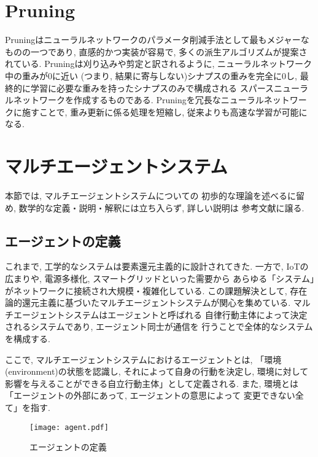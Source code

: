 \section{Pruning}
Pruningはニューラルネットワークのパラメータ削減手法として最もメジャーなものの一つであり, 
直感的かつ実装が容易で, 多くの派生アルゴリズムが提案されている.
Pruningは刈り込みや剪定と訳されるように, ニューラルネットワーク中の重みが0に近い
(つまり, 結果に寄与しない)シナプスの重みを完全に$0$し, 最終的に学習に必要な重みを持ったシナプスのみで構成される
スパースニューラルネットワークを作成するものである.
Pruningを冗長なニューラルネットワークに施すことで, 重み更新に係る処理を短縮し, 
従来よりも高速な学習が可能になる.
\clearpage
\section{マルチエージェントシステム}
本節では, マルチエージェントシステムについての
初歩的な理論を述べるに留め, 数学的な定義・説明・解釈には立ち入らず, 詳しい説明は
参考文献\cite{マルチエージェントシステムの基礎と応用}に譲る.
\subsection*{エージェントの定義}
これまで, 工学的なシステムは要素還元主義的に設計されてきた.
一方で, IoTの広まりや, 電源多様化, スマートグリッドといった需要から
あらゆる「システム」がネットワークに接続され大規模・複雑化している. 
この課題解決として, 
存在論的還元主義に基づいたマルチエージェントシステムが関心を集めている.
マルチエージェントシステムはエージェントと呼ばれる
自律行動主体によって決定されるシステムであり, エージェント同士が通信を
行うことで全体的なシステムを構成する.

ここで, マルチエージェントシステムにおけるエージェントとは, 
「環境(environment)の状態を認識し, 
それによって自身の行動を決定し, 
環境に対して影響を与えることができる自立行動主体」として定義される.
また, 環境とは「エージェントの外部にあって, エージェントの意思によって
変更できない全て」を指す.
\begin{figure}[H]
  \centering
  \texttt{[image: agent.pdf]}
  \caption{エージェントの定義}
\end{figure}

